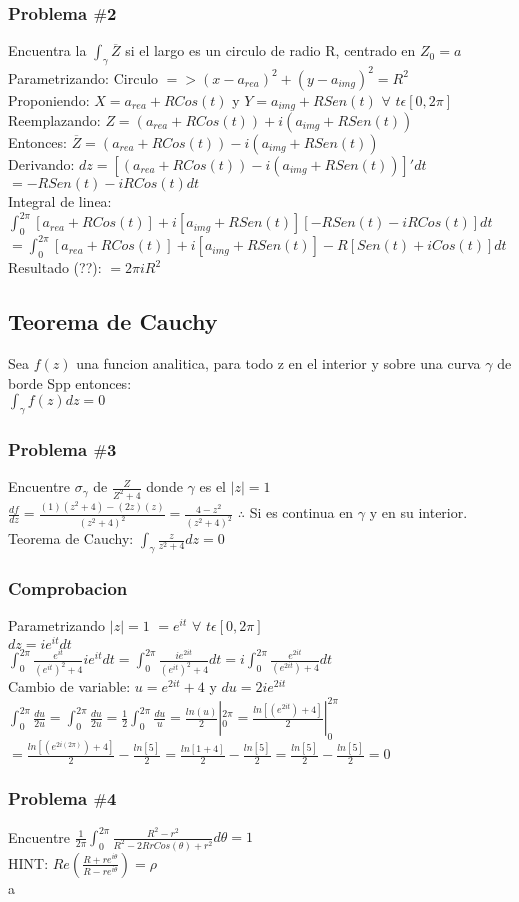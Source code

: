 \documentclass{article}
\begin{document}
\subsubsection*{Problema $\#$2}
Encuentra la $\int_{\gamma}\overline{Z}$ si el largo es un circulo de radio R, centrado en $Z_0 = a$
\\Parametrizando: Circulo $=> (x-a_{rea})^2+(y-a_{img})^2=R^2$
\\Proponiendo: $X = a_{rea} + RCos(t)$ y $Y = a_{img} + RSen(t)$ $\forall$ $t\epsilon[0, 2\pi]$ 
\\Reemplazando: $Z  = (a_{rea} + RCos(t))+i(a_{img} + RSen(t))$
\\Entonces: $\overline{Z}  = (a_{rea} + RCos(t))-i(a_{img} + RSen(t))$
\\Derivando: $dz = [(a_{rea} + RCos(t))-i(a_{img} + RSen(t))]'dt$
\\$= -RSen(t)-iRCos(t) dt$
\\Integral de linea: $\int_0^{2\pi}[a_{rea} + RCos(t)]+i[a_{img} + RSen(t)][-RSen(t)-iRCos(t)] dt$
\\$=\int_0^{2\pi}[a_{rea} + RCos(t)]+i[a_{img} + RSen(t)]-R[Sen(t)+iCos(t)] dt$
\\Resultado (??): $=2\pi i R^2$

\subsection*{Teorema de Cauchy}
Sea $f(z)$ una funcion analitica, para todo z en el interior y sobre una curva $\gamma$ de borde Spp entonces:
\\$\int_\gamma f(z)dz = 0$
\subsubsection*{Problema $\#$3}
Encuentre $\sigma_\gamma$ de $\frac{Z}{Z^2 + 4}$ donde $\gamma$ es el $|z| = 1$
\\$\frac{df}{dz} = \frac{(1)(z^2+4)-(2z)(z)}{(z^2+4)^2} = \frac{4-z^2}{(z^2+4)^2}$  $\therefore$ Si es continua en $\gamma$ y en su interior.
\\Teorema de Cauchy: $\int_\gamma\frac{z}{z^2+4}dz = 0$

\subsubsection*{Comprobacion} 
Parametrizando $|z|=1$ $= e^{it}$ $\forall$ $t \epsilon [0, 2\pi]$
\\$dz = ie^{it}dt$
\\$\int_0^{2\pi}\frac{e^{it}}{(e^{it})^2+4}ie^{it}dt = \int_0^{2\pi}\frac{ie^{2it}}{(e^{it})^2+4}dt = i\int_0^{2\pi}\frac{e^{2it}}{(e^{2it})+4}dt$
\\Cambio de variable: $u=e^{2it}+4$ y $du = 2ie^{2it}$
\\$\int_0^{2\pi}\frac{du}{2u} = \int_0^{2\pi}\frac{du}{2u} = \frac{1}{2}\int_0^{2\pi}\frac{du}{u} = \frac{ln(u)}{2}|_0^{2\pi} = \frac{ln[(e^{2it})+4]}{2}|_0^{2\pi}$
\\$= \frac{ln[(e^{2i(2\pi)})+4]}{2} - \frac{ln[5]}{2} =  \frac{ln[1+4]}{2} - \frac{ln[5]}{2} = \frac{ln[5]}{2}-\frac{ln[5]}{2} = 0$

\subsubsection*{Problema $\#$4}
Encuentre $\frac{1}{2\pi}\int_0^{2\pi}\frac{R^2-r^2}{R^2-2RrCos(\theta)+r^2} d\theta = 1$
\\HINT: $Re(\frac{R+re^{i\theta}}{R-re^{i\theta}}) = \rho$
\\a 
\end{document}
